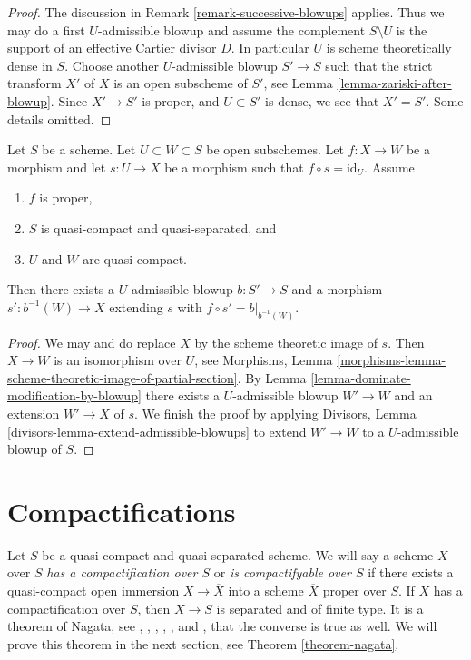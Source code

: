 \begin{proof}
The discussion in Remark \ref{remark-successive-blowups} applies.
Thus we may do a first $U$-admissible blowup and assume the complement
$S \setminus U$ is the support of an effective Cartier divisor $D$.
In particular $U$ is scheme theoretically dense in $S$.
Choose another $U$-admissible blowup $S' \to S$ such that the strict
transform $X'$ of $X$ is an open subscheme of $S'$, see
Lemma \ref{lemma-zariski-after-blowup}.
Since $X' \to S'$ is proper, and
$U \subset S'$ is dense, we see that $X' = S'$. Some details omitted.
\end{proof}

\begin{lemma}
\label{lemma-get-section-after-blowup}
Let $S$ be a scheme. Let $U \subset W \subset S$ be open subschemes.
Let $f : X \to W$ be a morphism and let $s : U \to X$ be a
morphism such that $f \circ s = \text{id}_U$. Assume
\begin{enumerate}
\item $f$ is proper,
\item $S$ is quasi-compact and quasi-separated, and
\item $U$ and $W$ are quasi-compact.
\end{enumerate}
Then there exists a $U$-admissible blowup $b : S' \to S$ and a morphism
$s' : b^{-1}(W) \to X$ extending $s$ with $f \circ s' = b|_{b^{-1}(W)}$.
\end{lemma}

\begin{proof}
We may and do replace $X$ by the scheme theoretic image of $s$.
Then $X \to W$ is an isomorphism over $U$, see
Morphisms, Lemma
\ref{morphisms-lemma-scheme-theoretic-image-of-partial-section}.
By Lemma \ref{lemma-dominate-modification-by-blowup}
there exists a $U$-admissible blowup $W' \to W$ and an
extension $W' \to X$ of $s$.
We finish the proof by applying
Divisors, Lemma \ref{divisors-lemma-extend-admissible-blowups}
to extend $W' \to W$ to a $U$-admissible blowup of $S$.
\end{proof}









\section{Compactifications}
\label{section-compactify}

\noindent
Let $S$ be a quasi-compact and quasi-separated scheme. We will say a
scheme $X$ over $S$ {\it has a compactification over $S$}
or {\it is compactifyable over $S$} if there exists
a quasi-compact open immersion $X \to \overline{X}$ into a scheme
$\overline{X}$ proper over $S$. If $X$ has a compactification over
$S$, then $X \to S$ is separated and of finite type. It is a theorem of
Nagata, see \cite{Lutkebohmert}, \cite{Conrad-Nagata}, \cite{Nagata-1},
\cite{Nagata-2}, \cite{Nagata-3}, and \cite{Nagata-4},
that the converse is true as well. We will prove this theorem
in the next section, see Theorem \ref{theorem-nagata}.

